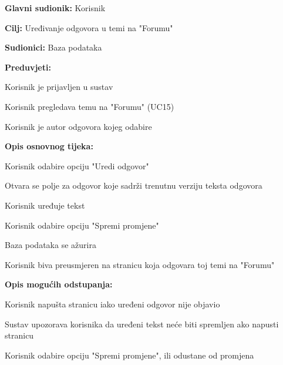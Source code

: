 					\noindent {}
					\begin{packed_item}
	
						\item \textbf{Glavni sudionik: }Korisnik
						\item  \textbf{Cilj:} Uređivanje odgovora u temi na "Forumu" 
						\item  \textbf{Sudionici:} Baza podataka
						\item  \textbf{Preduvjeti:}
						\item[] \begin{packed_enum}
							\item Korisnik je prijavljen u sustav
							\item Korisnik pregledava temu na "Forumu" (UC15)
							\item Korisnik je autor odgovora kojeg odabire
						\end{packed_enum}
						\item  \textbf{Opis osnovnog tijeka:}
						
						\item[] \begin{packed_enum}
	
							\item Korisnik odabire opciju "Uredi odgovor"
							\item Otvara se polje za odgovor koje sadrži trenutnu verziju teksta odgovora
							\item Korisnik uređuje tekst
							\item Korisnik odabire opciju "Spremi promjene"
							\item Baza podataka se ažurira
							\item Korisnik biva preusmjeren na stranicu koja odgovara toj temi na "Forumu"
							
						\end{packed_enum}
							
						\item  \textbf{Opis mogućih odstupanja:}
						
						\item[] \begin{packed_item}
						\item[4.a] Korisnik napušta stranicu iako uređeni odgovor nije objavio
							\item[] \begin{packed_enum}
								
								\item Sustav upozorava korisnika da uređeni tekst neće biti spremljen ako napusti stranicu
								\item Korisnik odabire opciju "Spremi promjene", ili odustane od promjena
								

\end{packed_enum}
\end{packed_item}
\end{packed_item}
